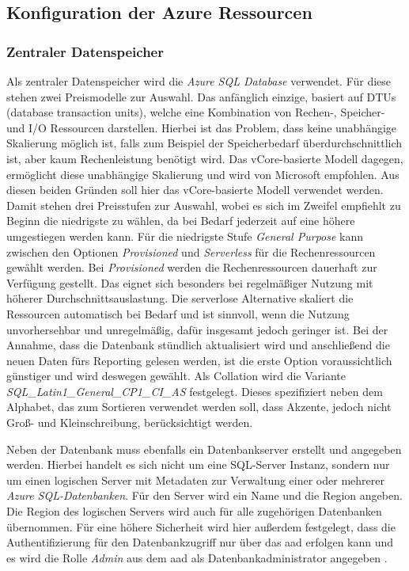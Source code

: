 \subsection{Konfiguration der Azure Ressourcen} \label{sec:umsetzen:konfiguration}

\subsubsection{Zentraler Datenspeicher} \label{subsec:umsetzen:konfiguration:datenspeicher}
Als zentraler Datenspeicher wird die \textit{Azure SQL Database} verwendet. Für diese stehen zwei Preismodelle zur Auswahl. Das anfänglich einzige, basiert auf DTUs (database transaction units), welche eine Kombination von Rechen-, Speicher- und I/O Ressourcen darstellen. Hierbei ist das Problem, dass keine unabhängige Skalierung möglich ist, falls zum Beispiel der Speicherbedarf überdurchschnittlich ist, aber kaum Rechenleistung benötigt wird. Das vCore-basierte Modell dagegen, ermöglicht diese unabhängige Skalierung und wird von Microsoft empfohlen. Aus diesen beiden Gründen soll hier das vCore-basierte Modell verwendet werden. Damit stehen drei Preisstufen zur Auswahl, wobei es sich im Zweifel empfiehlt zu Beginn die niedrigste zu wählen, da bei Bedarf jederzeit auf eine höhere umgestiegen werden kann. Für die niedrigste Stufe \textit{General Purpose} kann zwischen den Optionen \textit{Provisioned} und \textit{Serverless} für die Rechenressourcen gewählt werden. Bei \textit{Provisioned} werden die Rechenressourcen dauerhaft zur Verfügung gestellt. Das eignet sich besonders bei regelmäßiger Nutzung mit höherer Durchschnittsauslastung. Die serverlose Alternative skaliert die Ressourcen automatisch bei Bedarf und ist sinnvoll, wenn die Nutzung unvorhersehbar und unregelmäßig, dafür insgesamt jedoch geringer ist. Bei der Annahme, dass die Datenbank stündlich aktualisiert wird und anschließend die neuen Daten fürs Reporting gelesen werden, ist die erste Option voraussichtlich günstiger und wird deswegen gewählt. Als Collation wird die Variante \textit{SQL{\_}Latin1{\_}General{\_}CP1{\_}CI{\_}AS} festgelegt. Dieses spezifiziert neben dem Alphabet, das zum Sortieren verwendet werden soll, dass Akzente, jedoch nicht Groß- und Kleinschreibung, berücksichtigt werden. \cite[vgl.][]{mauri_azure_2021}

Neben der Datenbank muss ebenfalls ein Datenbankserver erstellt und angegeben werden. Hierbei handelt es sich nicht um eine SQL-Server Instanz, sondern nur um einen logischen Server mit Metadaten zur Verwaltung einer oder mehrerer \textit{Azure SQL-Datenbanken}. Für den Server wird ein Name und die Region angeben. Die Region des logischen Servers wird auch für alle zugehörigen Datenbanken übernommen. Für eine höhere Sicherheit wird hier außerdem festgelegt, dass die Authentifizierung für den Datenbankzugriff nur über das \ac{aad} erfolgen kann und es wird die Rolle \textit{Admin} aus dem \ac{aad} als Datenbankadministrator angegeben  \cite[vgl.][]{ward_azure_2021}.


